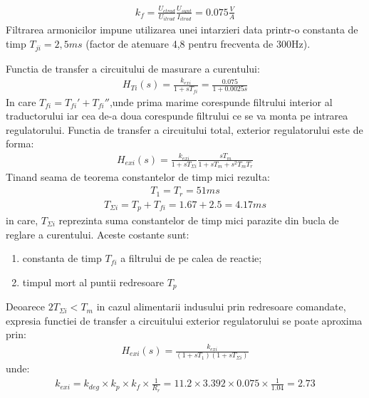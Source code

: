 \documentclass[11pt]{article}
\begin{document}
\begin{align*}
k_f=\frac{U_{etrad}}{U_{itrad}}\frac{U_{sunt}}{I_{itrad}}=0.075\frac{V}{A}
\end{align*}
Filtrarea armonicilor impune utilizarea unei intarzieri data printr-o constanta de timp $T_{ji}=2,5ms$ (factor de atenuare 4,8 pentru frecventa de 300Hz).

Functia de transfer a circuitului de masurare a curentului:
\begin{align*}
H_{Ti}(s)=\frac{k_{exi}}{1+sT_{fi}}=\frac{0.075}{1+0.0025s}
\end{align*}
In care $T_{fi}=T_{fi}'+T_{fi}''$,unde prima marime corespunde filtrului interior al traductorului iar cea de-a doua corespunde filtrului ce se va monta pe intrarea regulatorului. Functia de transfer a circuitului total, exterior regulatorului este de forma:
\begin{align*}
H_{exi}(s)=\frac{k_{exi}}{1+sT_{\Sigma i}}\frac{sT_m}{1+sT_m+s^2T_mT_r}
\end{align*}
Tinand seama de teorema constantelor de timp mici rezulta:
\begin{align*}
T_1=T_r=51ms
\end{align*}
\begin{align*}
T_{\Sigma i}=T_p+T_{fi}=1.67+2.5=4.17ms
\end{align*}
in care, $T_{\Sigma i}$ reprezinta suma constantelor de timp mici parazite din bucla de reglare a curentului. Aceste costante sunt:
\begin{enumerate}[label=$\bullet$]
	\item constanta de timp $T_{fi}$ a filtrului de pe calea de reactie;
	\item timpul mort al puntii redresoare $T_p$
\end{enumerate}
Deoarece $2T_{\Sigma i}<T_m$ in cazul alimentarii indusului prin redresoare comandate, expresia functiei de transfer a circuitului exterior regulatorului se poate aproxima prin:
\begin{align*}
H_{exi}(s)=\frac{k_{exi}}{(1+sT_1)(1+sT_{\Sigma i})}
\end{align*}
unde:
\begin{align*}
k_{exi}=k_{deg}\times k_p \times k_f \times \frac{1}{R_r}= 11.2 \times 3.392 \times 0.075 \times \frac{1}{1.04}=2.73
\end{align*}
\end{document}
